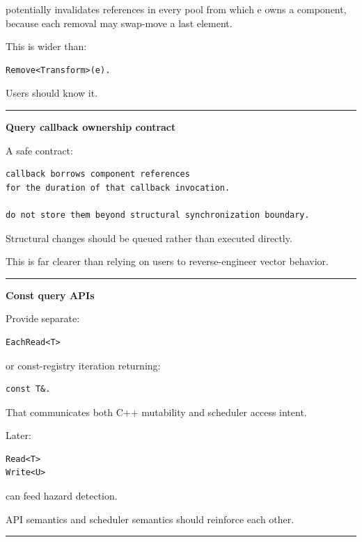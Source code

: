 potentially invalidates references in every pool from which e owns a component, because each removal may swap-move a last element.

This is wider than:

\begin{verbatim}
Remove<Transform>(e).
\end{verbatim}

Users should know it.

\begin{center}\rule{0.5\linewidth}{0.5pt}\end{center}

\textbf{Query callback ownership contract}

A safe contract:

\begin{verbatim}
callback borrows component references
for the duration of that callback invocation.

do not store them beyond structural synchronization boundary.
\end{verbatim}

Structural changes should be queued rather than executed directly.

This is far clearer than relying on users to reverse-engineer vector behavior.

\begin{center}\rule{0.5\linewidth}{0.5pt}\end{center}

\textbf{Const query APIs}

Provide separate:

\begin{verbatim}
EachRead<T>
\end{verbatim}

or const-registry iteration returning:

\begin{verbatim}
const T&.
\end{verbatim}

That communicates both C++ mutability and scheduler access intent.

Later:

\begin{verbatim}
Read<T>
Write<U>
\end{verbatim}

can feed hazard detection.

API semantics and scheduler semantics should reinforce each other.

\begin{center}\rule{0.5\linewidth}{0.5pt}\end{center}

